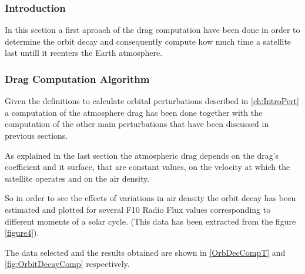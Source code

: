 \subsubsection{Introduction}

In this section a first aproach of the drag computation have been done in order to determine the orbit decay and consequently compute how much time a satellite last untill it reenters the Earth atmosphere.

\subsubsection{Drag Computation Algorithm}

Given the definitions to calculate orbital perturbations described in \ref{ch:IntroPert} a computation of the atmosphere drag has been done together with the computation of the other main perturbations that have been discussed in previous sections.

As explained in the last section the atmospheric drag depends on the drag's coefficient and it surface, that are constant values, on the velocity at which the satellite operates and on the air density.

So in order to see the effects of variations in air density the orbit decay has been estimated and plotted for several F10 Radio Flux values corresponding to different moments of a solar cycle. (This data has been extracted from the figure \ref{figure4}).

The data selected and the results obtained are shown in \ref{OrbDecCompT} and \ref{fig:OrbitDecayComp} respectively.



